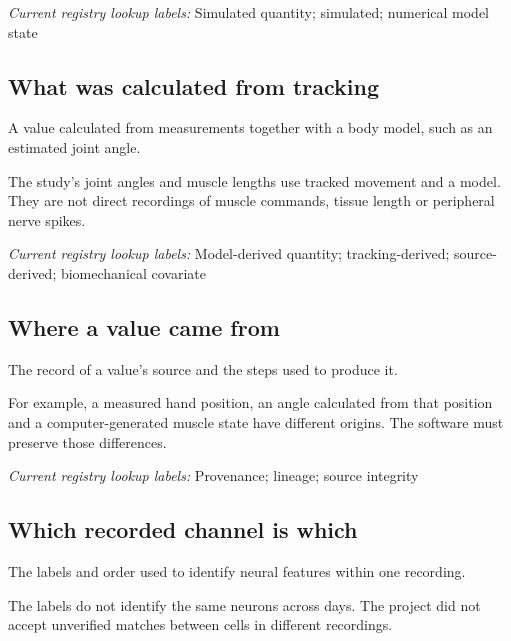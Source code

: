\noindent\textit{Current registry lookup labels:} Simulated quantity; simulated; numerical model state\par

\begin{samepage}
\subsection*{What was calculated from tracking}
\noindent A value calculated from measurements together with a body model, such as an estimated joint angle.\par
\end{samepage}
\begin{samepage}
\noindent The study’s joint angles and muscle lengths use tracked movement and a model. They are not direct recordings of muscle commands, tissue length or peripheral nerve spikes.\par\nopagebreak[4]

\end{samepage}


\noindent\textit{Current registry lookup labels:} Model-derived quantity; tracking-derived; source-derived; biomechanical covariate\par

\begin{samepage}
\subsection*{Where a value came from}
\noindent The record of a value’s source and the steps used to produce it.\par
\end{samepage}
\begin{samepage}
\noindent For example, a measured hand position, an angle calculated from that position and a computer-generated muscle state have different origins. The software must preserve those differences.\par\nopagebreak[4]

\end{samepage}


\noindent\textit{Current registry lookup labels:} Provenance; lineage; source integrity\par

\begin{samepage}
\subsection*{Which recorded channel is which}
\noindent The labels and order used to identify neural features within one recording.\par
\end{samepage}
\begin{samepage}
\noindent The labels do not identify the same neurons across days. The project did not accept unverified matches between cells in different recordings.\par\nopagebreak[4]

\end{samepage}



